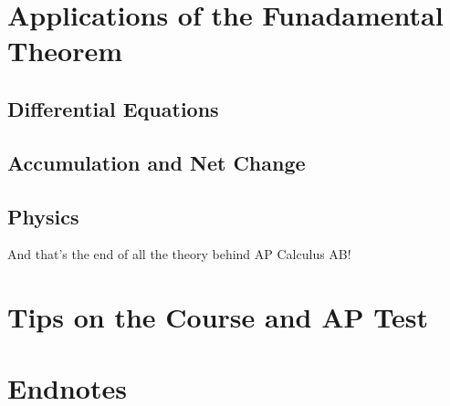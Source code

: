 \documentclass{article}
\begin{document}
\section{Applications of the Funadamental Theorem}
\subsection{Differential Equations}
\subsection{Accumulation and Net Change}\newpage
\subsection{Physics}
\newline\vspace{2in}
\begin{center}
And that's the end of all the theory behind AP Calculus AB!
\end{center}
\newpage
\section{Tips on the Course and AP Test}\newpage
\section{Endnotes}
\end{document}
